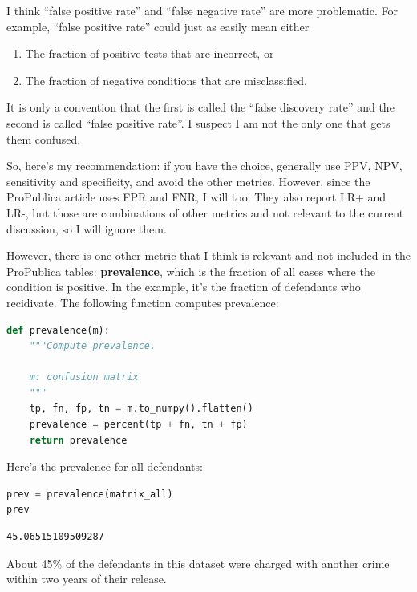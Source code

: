 I think ``false positive rate'' and ``false negative rate'' are more
problematic. For example, ``false positive rate'' could just as easily
mean either

\begin{enumerate}
\def\labelenumi{\arabic{enumi}.}
\item
  The fraction of positive tests that are incorrect, or
\item
  The fraction of negative conditions that are misclassified.
\end{enumerate}

It is only a convention that the first is called the ``false discovery
rate'' and the second is called ``false positive rate''. I suspect I am
not the only one that gets them confused.

So, here's my recommendation: if you have the choice, generally use PPV,
NPV, sensitivity and specificity, and avoid the other metrics. However,
since the ProPublica article uses FPR and FNR, I will too. They also
report LR+ and LR-, but those are combinations of other metrics and not
relevant to the current discussion, so I will ignore them.

However, there is one other metric that I think is relevant and not
included in the ProPublica tables: \textbf{prevalence}, which is the
fraction of all cases where the condition is positive. In the example,
it's the fraction of defendants who recidivate. The following function
computes prevalence:

\begin{lstlisting}[language=Python,style=source]
def prevalence(m):
    """Compute prevalence.

    m: confusion matrix
    """
    tp, fn, fp, tn = m.to_numpy().flatten()
    prevalence = percent(tp + fn, tn + fp)
    return prevalence
\end{lstlisting}

Here's the prevalence for all defendants:

\begin{lstlisting}[language=Python,style=source]
prev = prevalence(matrix_all)
prev
\end{lstlisting}

\begin{lstlisting}[style=output]
45.06515109509287
\end{lstlisting}

About 45\% of the defendants in this dataset were charged with another
crime within two years of their release.

